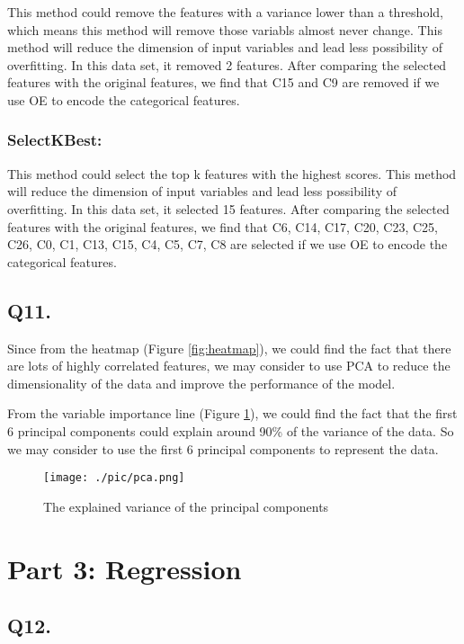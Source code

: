 \documentclass{article}
\begin{document}
This method could remove the features with a variance lower than a threshold, which means this method will remove those variabls almost never change. This method will reduce the dimension of input variables and lead less possibility of overfitting. 
In this data set, it removed 2 features. 
After comparing the selected features with the original features, 
we find that C15 and C9 are removed if we use OE to encode the categorical features.

\subsubsection*{SelectKBest:}

This method could select the top k features with the highest scores. This method will reduce the dimension of input variables and lead less possibility of overfitting.
In this data set, it selected 15 features.
After comparing the selected features with the original features,
we find that C6, C14, C17, C20, C23, C25, C26, C0, C1, C13, C15, C4, C5, C7, C8 are selected if we use OE to encode the categorical features.

\subsection*{Q11.}

Since from the heatmap (Figure \ref{fig:heatmap}), we could find the fact that there are lots of highly correlated features, we may consider to use PCA to reduce the dimensionality of the data and improve the performance of the model.

From the variable importance line (Figure \ref{fig:pca}), we could find the fact that the first 6 principal components could explain around 90\% of the variance of the data. So we may consider to use the first 6 principal components to represent the data.

\begin{figure}[h!]
    \centering
    \texttt{[image: ./pic/pca.png]}
    \caption{The explained variance of the principal components}
    \label{fig:pca}
\end{figure}

\newpage

\section*{Part 3: Regression}

\subsection*{Q12.}
\end{document}
